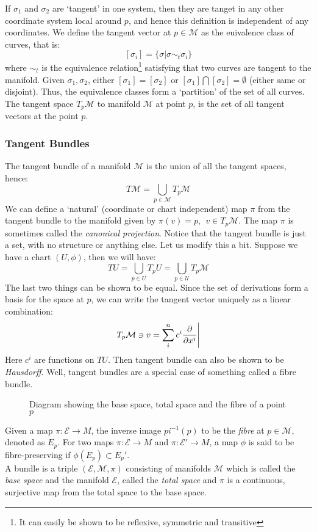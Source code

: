 If $\sigma_1$ and $\sigma_2$ are `tangent' in one system, then they are tanget in any other coordinate system local around $p$, and hence this definition is independent of any coordinates. We define the tangent vector at $p \in \mathcal{M}$ as the euivalence class of curves, that is:
$$[\sigma_i] = \{\sigma | \sigma \sim_t \sigma_i \}$$
where $\sim_t$ is the equivalence relation\footnote{It can easily be shown to be reflexive, symmetric and transitive} satisfying that two curves are tangent to the manifold. Given $\sigma_1, \sigma_2$, either $[\sigma_1]=[\sigma_2]$ or $[\sigma_1]\bigcap [\sigma_2] = \emptyset$ (either same or disjoint). Thus, the equivalence classes form a `partition' of the set of all curves. The tangent space $T_p\mathcal{M}$ to manifold $\mathcal{M}$ at point $p$, is the set of all tangent vectors at the point $p$. 
\subsubsection{Tangent Bundles}
The tangent bundle of a manifold $\mathcal{M}$ is the union of all the tangent spaces, hence: 
$$T\mathcal{M} = \bigcup\limits_{p\in \mathcal{M}}T_p\mathcal{M}$$
We can define a `natural' (coordinate or chart independent) map $\pi$ from the tangent bundle to the manifold given by $\pi(v) = p, \ \ v \in T_p\mathcal{M}$. The map $\pi$ is sometimes called the \textit{canonical projection}.
Notice that the tangent bundle is just a set, with no structure or anything else. Let us modify this a bit. Suppose we have a chart $(U,\phi)$, then we will have:
$$TU =  \bigcup\limits_{p\in {U}}T_p{U}= \bigcup\limits_{p\in \mathcal{U}}T_p\mathcal{M}$$ 
The last two things can be shown to be equal. Since the set of derivations form a basis for the space at $p$, we can write the tangent vector uniquely as a linear combination:
$$T_p\mathcal{M}\ni v = \sum\limits_{i}^n c^i \pdv{x^i}\Bigg|$$
Here $c^i$ are functions on $TU$. Then tangent bundle can also be shown to be \textit{Hausdorff}. Well, tangent bundles are a special case of something called a fibre bundle. 
\begin{figure}[H]
  \centering 
  
  \caption{Diagram showing the base space, total space and the fibre of a point $p$}
\end{figure}
\begin{definition}[Bundle]
  Given a map $\pi: \mathcal{E}\rightarrow M$, the inverse image $pi^{-1}(p)$ to be the \textit{fibre} at $p\in \mathcal{M}$, denoted as $E_p$. For two maps $\pi: \mathcal{E}\rightarrow M$ and $\pi: \mathcal{E}'\rightarrow M$, a map $\phi$ is said to be fibre-preserving if $\phi(E_p)\subset E_p'$.\\[0.2cm]
  A bundle is a triple $(\mathcal{E},\mathcal{M},\pi)$ consisting of manifolds $\mathcal{M}$ which is called the \textit{base space} and the manifold $\mathcal{E}$, called the \textit{total space} and $\pi$ is a continuous, surjective map from the total space to the base space.  
\end{definition}

